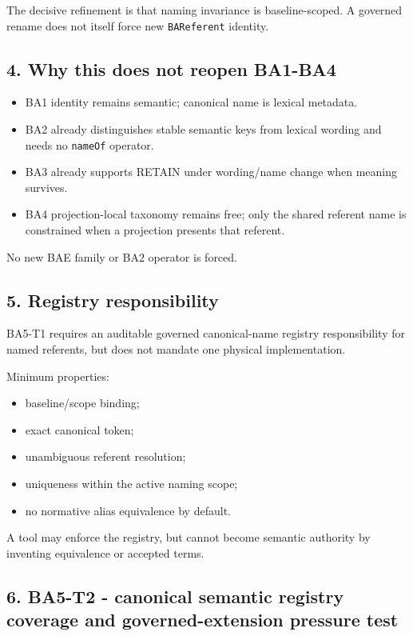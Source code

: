 \documentclass[
  10pt,
  a4paper,
]{article}
\providecommand{\tightlist}{%
  \setlength{\itemsep}{0pt}\setlength{\parskip}{0pt}}
\begin{document}
The decisive refinement is that naming invariance is baseline-scoped. A
governed rename does not itself force new \texttt{BAReferent} identity.

\subsection{4. Why this does not reopen
BA1-BA4}\label{why-this-does-not-reopen-ba1-ba4}

\begin{itemize}
\tightlist
\item
  BA1 identity remains semantic; canonical name is lexical metadata.
\item
  BA2 already distinguishes stable semantic keys from lexical wording
  and needs no \texttt{nameOf} operator.
\item
  BA3 already supports RETAIN under wording/name change when meaning
  survives.
\item
  BA4 projection-local taxonomy remains free; only the shared referent
  name is constrained when a projection presents that referent.
\end{itemize}

No new BAE family or BA2 operator is forced.

\subsection{5. Registry responsibility}\label{registry-responsibility}

BA5-T1 requires an auditable governed canonical-name registry
responsibility for named referents, but does not mandate one physical
implementation.

Minimum properties:

\begin{itemize}
\tightlist
\item
  baseline/scope binding;
\item
  exact canonical token;
\item
  unambiguous referent resolution;
\item
  uniqueness within the active naming scope;
\item
  no normative alias equivalence by default.
\end{itemize}

A tool may enforce the registry, but cannot become semantic authority by
inventing equivalence or accepted terms.

\subsection{6. BA5-T2 - canonical semantic registry coverage and
governed-extension pressure
test}\label{ba5-t2---canonical-semantic-registry-coverage-and-governed-extension-pressure-test}
\end{document}
